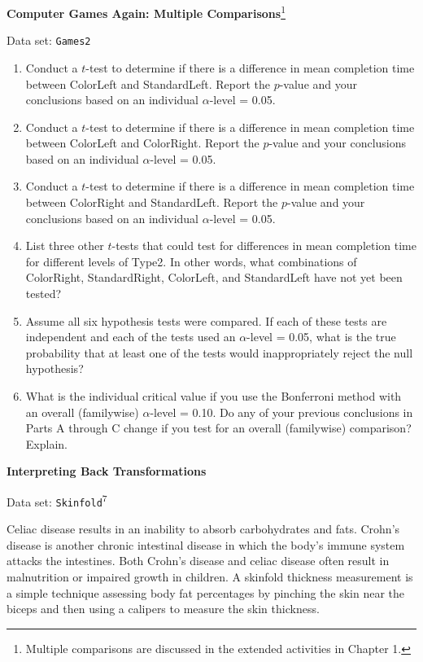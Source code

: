 \documentclass[
]{report}
\begin{document}
\begin{list}{E..}{ \setlength{\itemsep}{1.2em}}
  \item \textbf{Computer Games Again: Multiple Comparisons}\footnote{Multiple comparisons are discussed in the extended activities in Chapter 1.}

Data set: \texttt{Games2}

    \begin{enumerate}
      \item Conduct a $t$-test to determine if there is a difference in mean completion time between ColorLeft and StandardLeft. Report the $p$-value and your conclusions based on an individual $\alpha$-level = 0.05.
      \item Conduct a $t$-test to determine if there is a difference in mean completion time between ColorLeft and ColorRight. Report the $p$-value and your conclusions based on an individual $\alpha$-level = 0.05.
      \item Conduct a $t$-test to determine if there is a difference in mean completion time between ColorRight and StandardLeft. Report the $p$-value and your conclusions based on an individual $\alpha$-level = 0.05.
      \item List three other $t$-tests that could test for differences in mean completion time for different levels of Type2. In other words, what combinations of ColorRight, StandardRight, ColorLeft, and StandardLeft have not yet been tested?
      \item Assume all six hypothesis tests were compared. If each of these tests are independent and each of the tests used an $\alpha$-level = 0.05, what is the true probability that at least one of the tests would inappropriately reject the null hypothesis?
      \item What is the individual critical value if you use the Bonferroni method with an overall (familywise) $\alpha$-level = 0.10. Do any of your previous conclusions in Parts A through C change if you test for an overall (familywise) comparison? Explain.
    \end{enumerate}

  \item \textbf{Interpreting Back Transformations}

Data set: \texttt{Skinfold}\textsuperscript{7}

Celiac disease results in an inability to absorb carbohydrates and fats. Crohn’s disease is another chronic intestinal disease in which the body’s immune system attacks the intestines. Both Crohn’s disease and celiac disease often result in malnutrition or impaired growth in children. A skinfold thickness measurement is a simple technique assessing body fat percentages by pinching the skin near the biceps and then using a calipers to measure the skin thickness.


\end{list}
\end{document}
